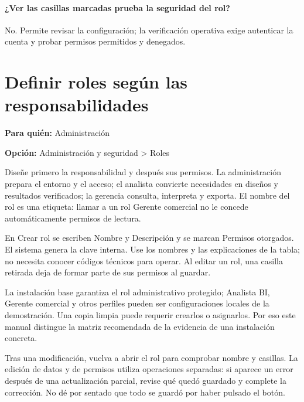 \paragraph{¿Ver las casillas marcadas prueba la seguridad del rol?} No. Permite revisar la configuración; la verificación operativa exige autenticar la cuenta y probar permisos permitidos y denegados.


\section{Definir roles según las responsabilidades}
\label{unidad:operacion_05}
\textbf{Para quién:} Administración\par
\textbf{Opción:} Administración y seguridad > Roles\par

Diseñe primero la responsabilidad y después sus permisos. La administración prepara el entorno y el acceso; el analista convierte necesidades en diseños y resultados verificados; la gerencia consulta, interpreta y exporta. El nombre del rol es una etiqueta: llamar a un rol Gerente comercial no le concede automáticamente permisos de lectura.

En Crear rol se escriben Nombre y Descripción y se marcan Permisos otorgados. El sistema genera la clave interna. Use los nombres y las explicaciones de la tabla; no necesita conocer códigos técnicos para operar. Al editar un rol, una casilla retirada deja de formar parte de sus permisos al guardar.

La instalación base garantiza el rol administrativo protegido; Analista BI, Gerente comercial y otros perfiles pueden ser configuraciones locales de la demostración. Una copia limpia puede requerir crearlos o asignarlos. Por eso este manual distingue la matriz recomendada de la evidencia de una instalación concreta.

Tras una modificación, vuelva a abrir el rol para comprobar nombre y casillas. La edición de datos y de permisos utiliza operaciones separadas: si aparece un error después de una actualización parcial, revise qué quedó guardado y complete la corrección. No dé por sentado que todo se guardó por haber pulsado el botón.

